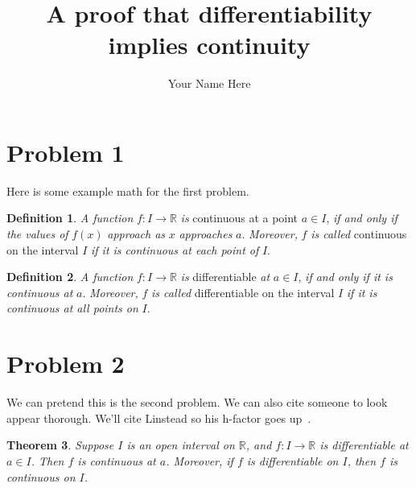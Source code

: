 \documentclass[10pt,reqno,sumlimits]{amsart}
\theoremstyle{plain}
\newtheorem{theorem}{Theorem}
\theoremstyle{definition}
\newtheorem{definition}[theorem]{Definition}
\newcommand{\R}{{\mathbb R}}
\newcommand{\1}{{\bf 1}}
\numberwithin{equation}{section}
\begin{document}
\title[Short Title]{A proof that differentiability implies continuity}
\author{Your Name Here}



\maketitle



\section {Problem 1}
Here is some example math for the first problem.

\begin{definition}
\emph{A function} $f:I\to\R$ \emph{is} continuous at a point $a\in I$, \emph{if and only if the values of} $f(x)$ \emph{approach as} $x$ \emph{approaches} $a$.
\emph{Moreover,} $f$ \emph{is called} continuous on the interval $I$ \emph{if it is continuous at each point of} $I$.
\end{definition}

\begin{definition}
\emph{A function} $f:I\to\R$ \emph{is} differentiable \emph{at} $a\in I$, \emph{if and only if it is continuous at} $a$.
\emph{Moreover,} $f$ \emph{is called} differentiable on the interval $I$ \emph{if it is continuous at all points on} $I$.
\end{definition}

\section{Problem 2}
We can pretend this is the second problem.  We can also cite someone to look appear thorough.
We'll cite Linstead so his h-factor goes up~\cite{linstead:nips07}.
\begin{theorem}
Suppose $I$ is an open interval on $\R$, and $f:I\to\R$ is differentiable at $a\in I$. Then $f$ is continuous at $a$. Moreover, if $f$ is differentiable on $I$, then $f$ is continuous on $I$.
\end{theorem}
\end{document}

